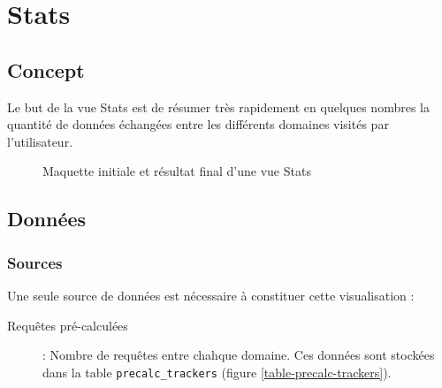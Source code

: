 \clearpage

%
%
%
%

\section{Stats}

	\subsection{Concept}

		Le but de la vue Stats est de résumer très rapidement en quelques nombres la quantité de données échangées entre les différents domaines visités par l'utilisateur.

		\begin{figure}[!h]
			\centering
			\caption{Maquette initiale et résultat final d'une vue Stats}
			\label{stats_images}
		\end{figure}

	\subsection{Données}

		\subsubsection{Sources}

			Une seule source de données est nécessaire à constituer cette visualisation :
			\begin{description}
				\item[Requêtes pré-calculées] : Nombre de requêtes entre chahque domaine. Ces données sont stockées dans la table \texttt{precalc\_trackers} (figure \ref{table-precalc-trackers}).
			\end{description}

